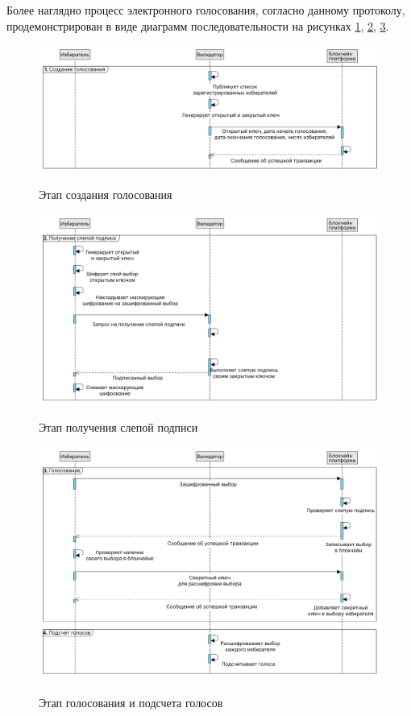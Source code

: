 Более наглядно процесс электронного голосования, согласно данному протоколу, продемонстрирован в виде диаграмм последовательности на рисунках \ref{fig:voteOne}, \ref{fig:voteTwo}, \ref{fig:voteThree}.

\begin{figure}[H]
\begin{center}
\includegraphics[width=1.0\hsize]{fig/nir-vote-1.png}\\[2mm]
\caption{Этап создания голосования}\label{fig:voteOne}
\end{center}
\end{figure}

\begin{figure}[H]
\begin{center}
\includegraphics[width=1.0\hsize]{fig/nir-vote-2.png}\\[2mm]
\caption{Этап получения слепой подписи}\label{fig:voteTwo}
\end{center}
\end{figure}

\begin{figure}[H]
\begin{center}
\includegraphics[width=1.0\hsize]{fig/nir-vote-3.png}\\[2mm]
\caption{Этап голосования и подсчета голосов}\label{fig:voteThree}
\end{center}
\end{figure}
